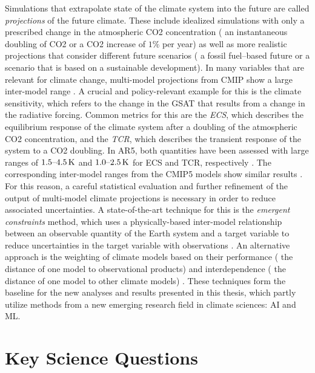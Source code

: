 Simulations that extrapolate state of the climate system into the future are
called \emph{projections} of the future climate. These include idealized
simulations with only a prescribed change in the atmospheric \ac{CO2}
concentration (\eg{} an instantaneous doubling of \ac{CO2} or a \ac{CO2}
increase of $1 \unit{\%}$ per year) as well as more realistic projections that
consider different future scenarios (\eg{} a fossil fuel--based future or a
scenario that is based on a sustainable development). In many variables that
are relevant for climate change, multi-model projections from \ac{CMIP} show a
large inter-model range \autocite{Collins2013, Flato2013}. A crucial and
policy-relevant example for this is the climate sensitivity, which refers to
the change in the \ac{GSAT} that results from a change in the radiative
forcing. Common metrics for this are the \emph{\ac{ECS}}, which describes the
equilibrium response of the climate system after a doubling of the atmospheric
\ac{CO2} concentration, and the \emph{\ac{TCR}}, which describes the transient
response of the system to a \ac{CO2} doubling. In \acs{AR}5, both quantities
have been assessed with large ranges of $\rangeunit{1.5}{4.5}{K}$ and
$\rangeunit{1.0}{2.5}{K}$ for \ac{ECS} and \ac{TCR}, respectively
\autocite{Stocker2013}. The corresponding inter-model ranges from the
\acs{CMIP}5 models show similar results \autocite{Flato2013}. For this reason,
a careful statistical evaluation and further refinement of the output of
multi-model climate projections is necessary in order to reduce associated
uncertainties. A state-of-the-art technique for this is the \emph{emergent
  constraints} method, which uses a physically-based inter-model relationship
between an observable quantity of the Earth system and a target variable to
reduce uncertainties in the target variable with observations
\autocite{Allen2002}. An alternative approach is the weighting of climate
models based on their performance (\ie{} the distance of one model to
observational products) and interdependence (\ie{} the distance of one model to
other climate models) \autocite{Knutti2017a}. These techniques form the
baseline for the new analyses and results presented in this thesis, which
partly utilize methods from a new emerging research field in climate sciences:
\ac{AI} and \ac{ML}.


\section{Key Science Questions}
\label{sec:01:key_science_questions}

